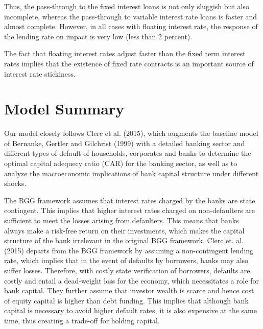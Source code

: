 \documentclass[12pt]{article}
\numberwithin{equation}{section}
\begin{document}
Thus, the pass-through to the fixed interest loans is not only sluggish but also incomplete, whereas the pass-through to variable interest rate loans is faster and almost complete. However, in all cases with floating interest rate, the response of the lending rate on impact is very low (less than 2 percent).

The fact that floating interest rates adjust faster than the fixed term interest rates implies that the existence of fixed rate contracts is an important source of interest rate stickiness. 



 
\section{Model Summary}
Our model closely follows Clerc et al. (2015), which augments the baseline model of Bernanke, Gertler and Gilchrist (1999) with a detailed banking sector and different types of default of households, corporates and banks to determine the optimal capital adequecy ratio (CAR) for the banking sector, as well as to analyze the macroeconomic implications of bank capital structure under different shocks. 

The BGG framework assumes that interest rates charged by the banks are state contingent. This implies that higher interest rates charged on non-defaulters are sufficient to meet the losses arising from defaulters. This means that banks always make a risk-free return on their investments, which makes the capital structure of the bank irrelevant in the original BGG framework. Clerc et. al. (2015) departs from the BGG framework by assuming a non-contingent lending rate, which implies that in the event of defaults by borrowers, banks may also suffer losses. Therefore, with costly state verification of borrowers, defaults are costly and entail a dead-weight loss for the economy, which necessitates a role for bank capital. They further assume that investor wealth is scarce and hence cost of equity capital is higher than debt funding. This implies that although bank capital is necessary to avoid higher default rates, it is also expensive at the same time, thus creating a trade-off for holding capital. 
\end{document}
